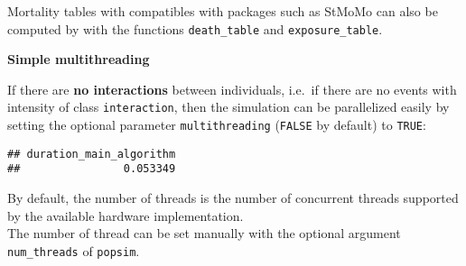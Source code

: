 Mortality tables with compatibles with packages such as StMoMo can also be computed by with the functions \texttt{death\_table} and \texttt{exposure\_table}.

\begin{Shaded}
\begin{Highlighting}[]
\StringTok{ }\NormalTok{pop\_out[pop\_out}\OperatorTok{$}\OperatorTok{==}\NormalTok{, ]}
\StringTok{ } \OperatorTok{:}\NormalTok{,} \OperatorTok{:}\NormalTok{) }
\StringTok{ } \OperatorTok{:}\NormalTok{,} \OperatorTok{:}\NormalTok{) }
\end{Highlighting}
\end{Shaded}

\textbf{Simple multithreading}

If there are \textbf{no interactions} between individuals, i.e.~if there are no events with intensity of class \texttt{interaction}, then the simulation can be parallelized easily by setting the optional parameter \texttt{multithreading} (\texttt{FALSE} by default) to \texttt{TRUE}:

\begin{Shaded}
\begin{Highlighting}[]
\StringTok{ }
                   \NormalTok{, } \NormalTok{)}
\end{Highlighting}
\end{Shaded}

\begin{verbatim}
## duration_main_algorithm 
##                0.053349
\end{verbatim}

By default, the number of threads is the number of concurrent threads supported by the available hardware implementation.\\
The number of thread can be set manually with the optional argument \texttt{num\_threads} of \texttt{popsim}.

